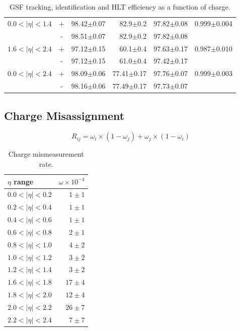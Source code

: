 \begin{table}[htb]
\begin{center}
\begin{tabular}{lcrrrr}
\hline
$0.0<| \eta |<1.4$ &+& 98.42$\pm$0.07 &82.9$\pm$0.2 &97.82$\pm$0.08 & 0.999$\pm$0.004\\
                   &-& 98.51$\pm$0.07 &82.9$\pm$0.2 &97.82$\pm$0.08 & \\
$1.6<| \eta |<2.4$ &+& 97.12$\pm$0.15 &60.1$\pm$0.4 &97.63$\pm$0.17 & 0.987$\pm$0.010\\
                   &-& 97.12$\pm$0.15 &61.0$\pm$0.4 &97.42$\pm$0.17 & \\
\hline
$0.0<| \eta |<2.4$ &+& 98.09$\pm$0.06 &77.41$\pm$0.17 &97.76$\pm$0.07 & 0.999$\pm$0.003\\
                   &-& 98.16$\pm$0.06 &77.49$\pm$0.17 &97.73$\pm$0.07 & \\
\end{tabular}
\end{center}
\caption{\label{tab:efficiency} GSF tracking, identification and HLT efficiency as a function of charge.}
\end{table}

\subsection{Charge Misassignment}
\begin{equation}
R_{ij}=\omega_i \times(1-\omega_j) + \omega_j \times(1-\omega_i)
\end{equation}

\begin{table}[htb]
  \begin{center}
\begin{tabular}{lr}
$\eta$ range        & $\omega \times 10^{-4}$    \\
\hline
$0.0<| \eta |<0.2$  & $ 1 \pm 1 $    \\ 
$0.2<| \eta |<0.4$  & $ 1 \pm 1 $    \\
$0.4<| \eta |<0.6$  & $ 1 \pm 1 $    \\
$0.6<| \eta |<0.8$  & $ 2 \pm 1 $    \\
$0.8<| \eta |<1.0$  & $ 4 \pm 2 $    \\ 
$1.0<| \eta |<1.2$  & $ 3 \pm 2 $    \\
$1.2<| \eta |<1.4$  & $ 3 \pm 2 $    \\
$1.6<| \eta |<1.8$  & $17 \pm 4 $    \\
$1.8<| \eta |<2.0$  & $12 \pm 4 $    \\
$2.0<| \eta |<2.2$  & $26 \pm 7 $    \\
$2.2<| \eta |<2.4$  & $ 7 \pm 7 $    \\
\end{tabular}
\caption{\label{tab:mischarge}Charge mismeasurement rate.}
\end{center}
\end{table}



